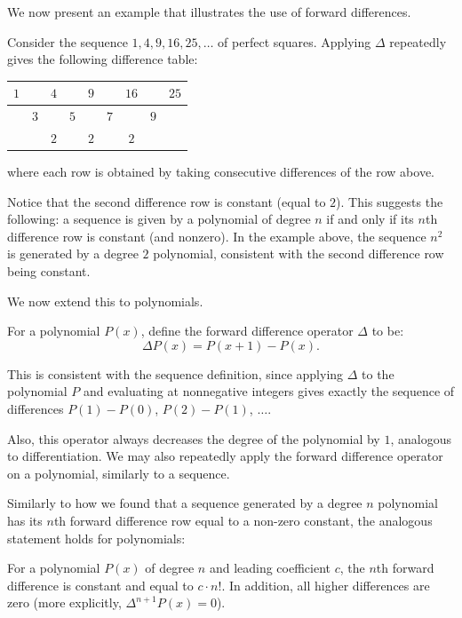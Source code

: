 \documentclass[11pt]{scrartcl}
\begin{document}
We now present an example that illustrates the use of forward differences.

\newpage

\begin{example*}
Consider the sequence $1, 4, 9, 16, 25, \dots$ of perfect squares. Applying $\Delta$ repeatedly gives the following difference table:

\begin{center}
\begin{tabular}{ccccccccc}
\hline
$1$ & & $4$ & & $9$ & & $16$ & & $25$ \\
\hline
& $3$ & & $5$ & & $7$ & & $9$ & \\
\hline
& & $2$ & & $2$ & & $2$ & & \\
\hline
\end{tabular}
\end{center}
where each row is obtained by taking consecutive differences of the row above.
\end{example*}

Notice that the second difference row is constant (equal to $2$). This suggests the following: a sequence is given by a polynomial of degree $n$ if and only if its $n$th difference row is constant (and nonzero). In the example above, the sequence $n^2$ is generated by a degree $2$ polynomial, consistent with the second difference row being constant.

We now extend this to polynomials.

\begin{definition*}
For a polynomial $P(x)$, define the forward difference operator $\Delta$ to be: \[\Delta P(x) = P(x+1)-P(x).\]
\end{definition*}

This is consistent with the sequence definition, since applying $\Delta$ to the polynomial $P$ and evaluating at nonnegative integers gives exactly the sequence of differences $P(1)-P(0)$, $P(2)-P(1)$, $\dots$.

Also, this operator always decreases the degree of the polynomial by $1$, analogous to differentiation. We may also repeatedly apply the forward difference operator on a polynomial, similarly to a sequence.

Similarly to how we found that a sequence generated by a degree $n$ polynomial has its $n$th forward difference row equal to a non-zero constant, the analogous statement holds for polynomials:

\begin{theorem*}
For a polynomial $P(x)$ of degree $n$ and leading coefficient $c$, the $n$th forward difference is constant and equal to $c\cdot n!$. In addition, all higher differences are zero (more explicitly, $\Delta^{n+1}P(x)=0$). 
\end{theorem*}
\end{document}
